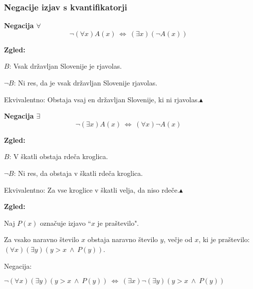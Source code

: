\documentclass[11pt,paper=b5,footinclude,headinclude]{scrbook} %
\def\ali {{~\vee~}}
\def\inn {{~\wedge~}}
\def\sledi {{~\Rightarrow~}}
\def\cee {{~\Leftrightarrow~}}
\def\zgled{\noindent\textbf{\color{blue} Zgled: }}
\def\kz{{\hfill{\color{blue}$\blacktriangle$}}}%
\begin{document}
\subsubsection{Negacije izjav s kvantifikatorji}

\textbf{ Negacija $\forall$}
$$\neg (\forall x)A(x) \cee  (\exists x) (\neg A(x))$$

\medskip
\zgled

$B$: Vsak državljan Slovenije je rjavolas.

$\neg B$: Ni res, da je vsak državljan Slovenije rjavolas.

Ekvivalentno: Obstaja vsaj en državljan Slovenije, ki ni rjavolas.\kz

\medskip

\noindent\textbf{ Negacija $\exists$}
$$\neg  (\exists x)A(x) \cee (\forall x) \neg A(x)$$

\medskip
\zgled

$B$: V škatli obstaja rdeča kroglica.

$\neg B$: Ni res, da obstaja v škatli rdeča kroglica.

Ekvivalentno: Za vse kroglice v škatli velja, da niso rdeče.\kz


%
%
%
%
%
%
%
%
%
%
%
%
%
\zgled

Naj $P(x)$ označuje izjavo ``$x$ je praštevilo".

Za vsako naravno število $x$ obstaja naravno število $y$, večje od $x$, ki je praštevilo:
  $(\forall x)(\exists y)(y>x\inn P(y))$.

  Negacija:

  $\neg (\forall x)(\exists y)(y>x\inn P(y)) \cee(\exists  x)\neg (\exists y)(y>x\inn P(y))$
\end{document}
